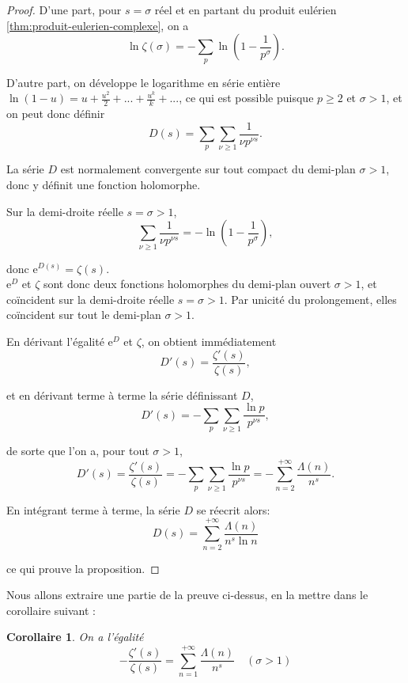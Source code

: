 \documentclass[french]{report}
\newtheorem{corollary}[theorem]{Corollaire}
\begin{document}
\begin{proof}
  D'une part, pour $s=\sigma$ réel et en partant du produit eulérien \ref{thm:produit-eulerien-complexe}, on a
  \[ \ln\zeta(\sigma) = -\sum_p\ln\left(1-\frac{1}{p^\sigma}\right). \]

  D'autre part, on développe le logarithme en série entière $\ln(1-u)=u+\frac{u^2}{2}+...+\frac{u^k}{k}+...$, ce qui est possible puisque $p\geq2$ et $\sigma>1$, et on peut donc définir
  \[ D(s) = \sum_p\sum_{\nu\geq1}\frac{1}{\nu p^{\nu s}}. \]
  
  La série $D$ est normalement convergente sur tout compact du demi-plan $\sigma>1$, donc y définit une fonction holomorphe.

  Sur la demi-droite réelle $s=\sigma>1$,
  \[ \sum_{\nu\geq1}\frac{1}{\nu p^{\nu s}} = -\ln\left(1-\frac{1}{p^\sigma}\right), \]

  donc $\mathrm{e}^{D(s)}=\zeta(s)$.
  \\
  
  $\mathrm{e}^D$ et $\zeta$ sont donc deux fonctions holomorphes du demi-plan ouvert $\sigma>1$, et coïncident sur la demi-droite réelle $s=\sigma>1$. Par unicité du prolongement, elles coïncident sur tout le demi-plan $\sigma>1$.

  En dérivant l'égalité $\mathrm{e}^D$ et $\zeta$, on obtient immédiatement
  \[ D'(s)=\frac{\zeta'(s)}{\zeta(s)}, \]
  
  et en dérivant terme à terme la série définissant $D$, 
  \[ D'(s) = -\sum_p\sum_{\nu\geq1}\frac{\ln p}{p^{\nu s}}, \]

  de sorte que l'on a, pour tout $\sigma>1$,
  \[
    D'(s)
    = \frac{\zeta'(s)}{\zeta(s)}
    = -\sum_p\sum_{\nu\geq1}\frac{\ln p}{p^{\nu s}}
    = -\sum_{n=2}^{+\infty}\frac{\Lambda(n)}{n^s}.
  \]

  En intégrant terme à terme, la série $D$ se réecrit alors:
  \[ D(s) = \sum_{n=2}^{+\infty}\frac{\Lambda(n)}{n^s\ln n} \]

  ce qui prouve la proposition.
\end{proof}

Nous allons extraire une partie de la preuve ci-dessus, en la mettre dans le corollaire suivant :

\begin{corollary}\label{cor:zeta-zeta-prime-van-mangoldt}
  On a l'égalité
  \[ -\frac{\zeta'(s)}{\zeta(s)} = \sum_{n=1}^{+\infty}\frac{\Lambda(n)}{n^s}\quad(\sigma>1) \]
\end{corollary}
\end{document}
